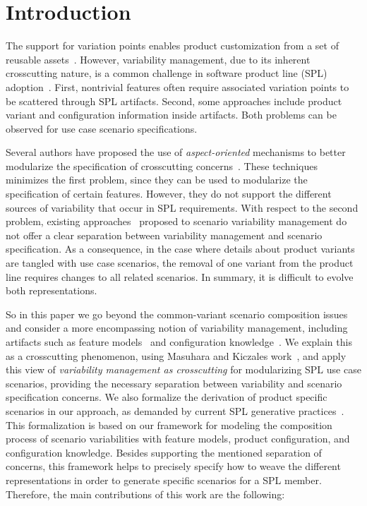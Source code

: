 \documentclass{acm_proc_article-sp}
\begin{document}


\section{Introduction}
The support for variation points enables product customization from a set of
reusable assets~\cite{Pohl:2005aa}. However, variability management, due to its
inherent crosscutting nature, is a common challenge in software product line
(SPL) adoption~\cite{Clements:2001aa,Pohl:2005aa}. First, nontrivial features
often require associated variation points to be scattered through SPL artifacts.
Second, some approaches include product variant and configuration information
inside artifacts. Both problems can be observed for use case scenario
specifications.

Several authors have proposed the use of \emph{aspect-oriented} mechanisms to
better modularize the specification of crosscutting
concerns~\cite{Moreira:2004aa,Chitchyan:2007aa}. These techniques minimizes the
first problem, since they can be used to modularize the specification of certain
features. However, they do not support the different sources of variability that
occur in SPL requirements. With respect to the second problem, existing
approaches~\cite{Griss:1998aa,Bertolino:2003aa,Eriksson:2005aa} proposed to
scenario variability management do not offer a clear separation between
variability management and scenario specification. As a consequence, in the case
where details about product variants are tangled with use case scenarios, the
removal of one variant from the product line requires changes to all related
scenarios. In summary, it is difficult to evolve both representations.

So in this paper we go beyond the common-variant scenario composition issues and
consider a more encompassing notion of variability management, including
artifacts such as feature models~\cite{Gheyi:2006aa,Czarnecki:2000aa} and
configuration knowledge~\cite{Czarnecki:2000aa,Pohl:2005aa}. We explain this as a
crosscutting phenomenon, using Masuhara and Kiczales work~\cite{Masuhara:2003aa},
and apply this view of \emph{variability management as crosscutting} for
modularizing SPL use case scenarios, providing the necessary separation between
variability and scenario specification concerns. We also formalize the derivation
of product specific scenarios in our approach, as demanded by current SPL
generative practices~\cite{Krueger:2006aa}. This formalization is based on our
framework for modeling the composition process of scenario variabilities with
feature models, product configuration, and configuration knowledge. Besides
supporting the mentioned separation of concerns, this framework helps to
precisely specify how to weave the different representations in order to generate
specific scenarios for a SPL member. Therefore, the main contributions of this
work are the following:
\end{document}
